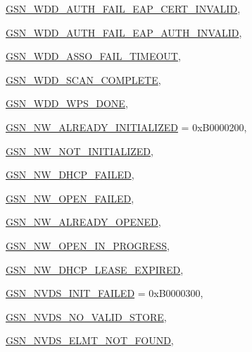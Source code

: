 \begin{DoxyCompactItemize}
\par
\hyperlink{a00659_gga476ae1caf992f8287176b2cc414c8707a5493fe620f8cceca33e723f17861edba}{GSN\_\-WDD\_\-AUTH\_\-FAIL\_\-EAP\_\-CERT\_\-INVALID}, 
\par
\hyperlink{a00659_gga476ae1caf992f8287176b2cc414c8707aa99c07bc1b6c819f5e04398362953e04}{GSN\_\-WDD\_\-AUTH\_\-FAIL\_\-EAP\_\-AUTH\_\-INVALID}, 
\par
\hyperlink{a00659_gga476ae1caf992f8287176b2cc414c8707a83eebf46865ac5391ca2921f09413e30}{GSN\_\-WDD\_\-ASSO\_\-FAIL\_\-TIMEOUT}, 
\par
\hyperlink{a00659_gga476ae1caf992f8287176b2cc414c8707a094706054ce496aaf5f6da26f7e36541}{GSN\_\-WDD\_\-SCAN\_\-COMPLETE}, 
\par
\hyperlink{a00659_gga476ae1caf992f8287176b2cc414c8707a68971dcaaef7eb226b006bf237b2bdda}{GSN\_\-WDD\_\-WPS\_\-DONE}, 
\par
\hyperlink{a00659_gga476ae1caf992f8287176b2cc414c8707a555a8446aac8b73d3b85c8bb4e9bc61c}{GSN\_\-NW\_\-ALREADY\_\-INITIALIZED} =  0xB0000200, 
\par
\hyperlink{a00659_gga476ae1caf992f8287176b2cc414c8707a64abcaf92b3dbbaede3601f2f22d9220}{GSN\_\-NW\_\-NOT\_\-INITIALIZED}, 
\par
\hyperlink{a00659_gga476ae1caf992f8287176b2cc414c8707ab3e49950d09ad8831823af935dafba4a}{GSN\_\-NW\_\-DHCP\_\-FAILED}, 
\par
\hyperlink{a00659_gga476ae1caf992f8287176b2cc414c8707a789dbdb3fc16ca9b3c90480b91459283}{GSN\_\-NW\_\-OPEN\_\-FAILED}, 
\par
\hyperlink{a00659_gga476ae1caf992f8287176b2cc414c8707a42bbbe92fc85a0baefb07f63f1c392bb}{GSN\_\-NW\_\-ALREADY\_\-OPENED}, 
\par
\hyperlink{a00659_gga476ae1caf992f8287176b2cc414c8707aa1061f5002a7468c6dcae80272b26b64}{GSN\_\-NW\_\-OPEN\_\-IN\_\-PROGRESS}, 
\par
\hyperlink{a00659_gga476ae1caf992f8287176b2cc414c8707a2f544f63345dfce84cc353c6155f9eca}{GSN\_\-NW\_\-DHCP\_\-LEASE\_\-EXPIRED}, 
\par
\hyperlink{a00659_gga476ae1caf992f8287176b2cc414c8707ac559e6ea3217b9084e13b8191ef71163}{GSN\_\-NVDS\_\-INIT\_\-FAILED} =  0xB0000300, 
\par
\hyperlink{a00659_gga476ae1caf992f8287176b2cc414c8707ae659084f1f26f351daa26577f93bfc03}{GSN\_\-NVDS\_\-NO\_\-VALID\_\-STORE}, 
\par
\hyperlink{a00659_gga476ae1caf992f8287176b2cc414c8707a44c7d2ef1d710f2fe0930ded1a8a93e4}{GSN\_\-NVDS\_\-ELMT\_\-NOT\_\-FOUND}, 

\end{DoxyCompactItemize}
